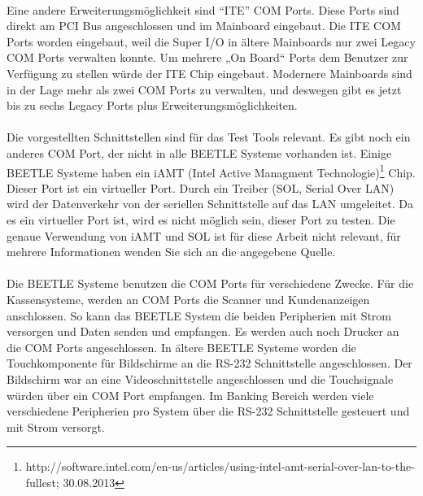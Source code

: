 \paragraph{}
Eine andere Erweiterungsmöglichkeit sind "`ITE"' COM Ports. Diese Ports sind direkt am PCI Bus angeschlossen und im Mainboard eingebaut. Die ITE COM Ports worden eingebaut, weil die Super I/O in ältere Mainboards nur zwei Legacy COM Ports verwalten konnte. Um mehrere „On Board“ Ports dem Benutzer zur Verfügung zu stellen würde der ITE Chip eingebaut. Modernere Mainboards sind in der Lage mehr als zwei COM Ports zu verwalten, und deswegen gibt es jetzt bis zu sechs Legacy Ports plus Erweiterungsmöglichkeiten.
 
\paragraph{}
Die vorgestellten Schnittstellen sind für das Test Tools relevant. Es gibt noch ein anderes COM Port, der nicht in alle BEETLE Systeme vorhanden ist. Einige BEETLE Systeme haben ein iAMT (Intel Active Managment Technologie)\footnote{http://software.intel.com/en-us/articles/using-intel-amt-serial-over-lan-to-the-fullest; 30.08.2013} Chip. Dieser Port ist ein virtueller Port. Durch ein Treiber (SOL, Serial Over LAN) wird der Datenverkehr von der seriellen Schnittstelle auf das LAN umgeleitet. Da es ein virtueller Port ist, wird es nicht möglich sein, dieser Port zu testen. Die genaue Verwendung von iAMT und SOL ist für diese Arbeit nicht relevant, für mehrere Informationen wenden Sie sich an die angegebene Quelle.
 
\paragraph{}
Die BEETLE Systeme benutzen die COM Ports für verschiedene Zwecke. Für die Kassensysteme, werden an COM Ports die Scanner und Kundenanzeigen anschlossen. So kann das BEETLE System die beiden Peripherien mit Strom versorgen und Daten senden und empfangen. Es werden auch noch Drucker an die COM Ports angeschlossen. In ältere BEETLE Systeme worden die Touchkomponente für Bildschirme an die RS-232 Schnittstelle angeschlossen. Der Bildschirm war an eine Videoschnittstelle angeschlossen und die Touchsignale würden über ein COM Port empfangen. Im Banking Bereich werden viele verschiedene Peripherien pro System über die RS-232 Schnittstelle gesteuert und mit Strom versorgt.



\newpage






